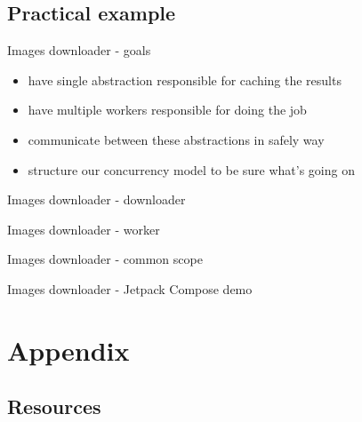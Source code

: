 \documentclass[hyperref={pdfpagelabels=false},xcolor={dvipsnames},compress,onlytextwidth]{beamer}
\begin{document}
    \subsection{Practical example}



    \begin{frame}[fragile]{Images downloader - goals}
        \begin{itemize}
            \item have single abstraction responsible for caching the results\pause
            \item have multiple workers responsible for doing the job\pause
            \item communicate between these abstractions in safely way\pause
            \item structure our concurrency model to be sure what's going on
        \end{itemize}
    \end{frame}

    \begin{frame}[fragile]{Images downloader - downloader}
        
    \end{frame}

    \begin{frame}[fragile]{Images downloader - worker}
        
    \end{frame}

    \begin{frame}[fragile]{Images downloader - common scope}
        
    \end{frame}

    \begin{frame}[fragile]{Images downloader - Jetpack Compose demo}
        
    \end{frame}

    \section*{Appendix}
    \subsection*{Resources}
\end{document}
